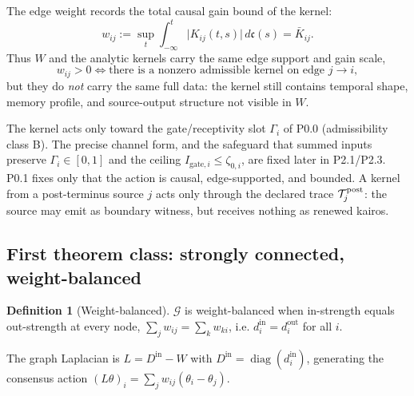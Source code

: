 \documentclass[11pt,a4paper]{article}
\theoremstyle{definition}
\newtheorem{definition}{Definition}[section]
\theoremstyle{plain}
\theoremstyle{remark}
\begin{document}
The edge weight records the total causal gain bound of the kernel:
\[
w_{ij}:=\sup_t\int_{-\infty}^{t}\bigl|K_{ij}(t,s)\bigr|\,d\mathfrak c(s)=\bar K_{ij}.
\]
Thus $W$ and the analytic kernels carry the same edge support and gain scale,
\[
w_{ij}>0\iff\text{there is a nonzero admissible kernel on edge }j\!\to\!i,
\]
but they do \emph{not} carry the same full data: the kernel still contains temporal
shape, memory profile, and source-output structure not visible in $W$.

The kernel acts only toward the gate/receptivity slot $\Gamma_i$ of P0.0
(admissibility class B). The precise channel form, and the safeguard that summed
inputs preserve $\Gamma_i\in[0,1]$ and the ceiling $I_{\mathrm{gate},i}\le\zeta_{0,i}$,
are fixed later in P2.1/P2.3. P0.1 fixes only that the action is causal,
edge-supported, and bounded. A kernel from a post-terminus source $j$ acts only
through the declared trace $\mathcal T_j^{\rm post}$: the source may emit as boundary
witness, but receives nothing as renewed kairos.

\subsection{First theorem class: strongly connected, weight-balanced}

\begin{definition}[Weight-balanced]
$\mathcal G$ is weight-balanced when in-strength equals out-strength at every node,
$\sum_j w_{ij}=\sum_k w_{ki}$, i.e. $d_i^{\mathrm{in}}=d_i^{\mathrm{out}}$ for all $i$.
\end{definition}

The graph Laplacian is $L=D^{\mathrm{in}}-W$ with $D^{\mathrm{in}}=\operatorname{diag}(d_i^{\mathrm{in}})$,
generating the consensus action $(L\theta)_i=\sum_j w_{ij}(\theta_i-\theta_j)$.
\end{document}
